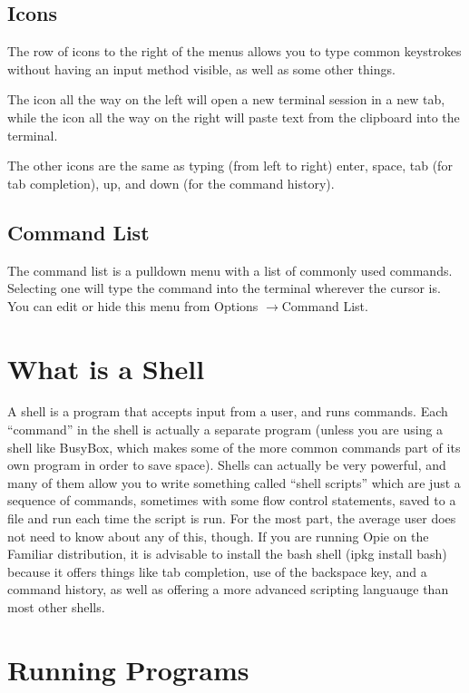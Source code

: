 \documentclass[12pt,letterpaper,oneside, openany]{book} \usepackage[latin1] {inputenc}
\begin{document}
\subsection{Icons}

The row of icons to the right of the menus allows you to type common keystrokes without having an input method visible, as well as some other things.

The icon all the way on the left will open a new terminal session in a new tab, while the icon all the way on the right will paste text from the clipboard into the terminal.

The other icons are the same as typing (from left to right) enter, space, tab (for tab completion), up, and down (for the command history).

\subsection{Command List}

The command list is a pulldown menu with a list of commonly used commands.  Selecting one will type the command into the terminal wherever the cursor is.  You can edit or hide this menu from Options \begin{math}\rightarrow\end{math}Command List.

\section{What is a Shell}

A shell is a program that accepts input from a user, and runs commands.  Each ``command'' in the shell is actually a separate program (unless you are using a shell like BusyBox, which makes some of the more common commands part of its own program in order to save space).  Shells can actually be very powerful, and many of them allow you to write something called ``shell scripts'' which are just a sequence of commands, sometimes with some flow control statements, saved to a file and run each time the script is run.  For the most part, the average user does not need to know about any of this, though.  If you are running Opie on the Familiar distribution, it is advisable to install the bash shell (ipkg install bash) because it offers things like tab completion, use of the backspace key, and a command history, as well as offering a more advanced scripting languauge than most other shells.

\section{Running Programs}
\end{document}
